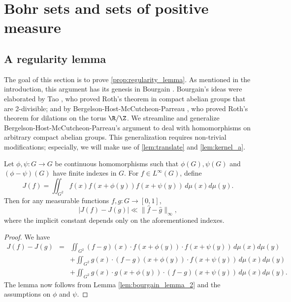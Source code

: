 \section{Bohr sets and sets of positive measure}
\label{sec:density}

\subsection{A regularity lemma}
The goal of this section is to prove \cref{prop:regularity_lemma}. As mentioned in the introduction, this argument has its genesis in Bourgain \cite{bourgain-roth}. Bourgain's ideas were elaborated by Tao \cite{tao}, who proved Roth's theorem in compact abelian groups that are 2-divisible; and by Bergelson-Host-McCutcheon-Parreau \cite[Theorem 4.1]{bhmp}, who proved Roth's theorem for dilations on the torus $\R / \Z$. We streamline and generalize Bergelson-Host-McCutcheon-Parreau's argument to deal with homomorphisms on arbitrary compact abelian groups. This generalization requires non-trivial modifications; especially, we will make use of \cref{lem:translate} and \cref{lem:kernel_a}. 



\begin{lemma}
\label{lem:J}
Let $\phi, \psi: G \rightarrow G$ be continuous homomorphisms such that $\phi(G), \psi(G)$ and $(\phi-\psi)(G)$ have finite indexes in $G$. For $f \in L^\infty(G)$, define
\[
J(f) = \iint_{G^2} f(x)f(x+ \phi(y))f(x+ \psi(y)) \, d\mu(x) d\mu(y).
\]
Then for any measurable functions $f, g: G \to [0,1]$, 
    \begin{equation*} \label{eq:c}
        |J(f) - J(g)| \ll \| \widehat{f} - \widehat{g} \|_\infty,
    \end{equation*}
where the implicit constant depends only on the aforementioned indexes. 
\end{lemma}

\begin{proof}
We have
\begin{eqnarray*}
J(f) - J(g) &=& \iint_{G^2} (f-g)(x) \cdot f(x+ \phi(y)) \cdot f(x+ \psi(y)) \, d\mu(x) d\mu(y) \\
& & + \iint_{G^2} g(x) \cdot ( f-g) (x+ \phi(y)) \cdot f(x+ \psi(y)) \, d\mu(x) d\mu(y) \\
& & + \iint_{G^2} g(x) \cdot g(x+ \phi(y)) \cdot (f - g) (x + \psi(y)) \, d\mu(x) d\mu(y).
\end{eqnarray*}
The lemma now follows from Lemma \ref{lem:bourgain_lemma_2} and the assumptions on $\phi$ and $\psi$.
\end{proof}



